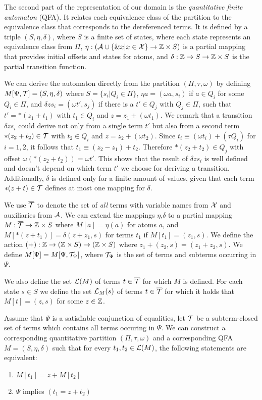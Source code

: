 The second part of the representation of our domain is the \emph{quantitative finite automaton} (QFA). It relates each equivalence class of the partition to the equivalence class that corresponds to the dereferenced terms.
It is defined by a triple $(S, \eta, \delta)$, where $S$ is a finite set of states, where each state represents an equivalence class from $\Pi$, $\eta : (\mathcal{A} \cup \{\&x | x \in \mathcal{X}\} \rightarrow \mathbb{Z} \times S)$ is a partial mapping that provides initial offsets and states for atoms, and $\delta : \mathbb{Z} \rightarrow S \rightarrow \mathbb{Z} \times S$ is the partial transition function.

We can derive the automaton directly from the partition $(\Pi, \tau, \omega)$ by defining $M[\Psi,\mathcal{T}] = (S, \eta, \delta)$ where $S = \{s_i | Q_i \in \Pi\}$, $\eta a = (\omega a, s_i)$ if $a \in Q_i$ for some $Q_i \in \Pi$, and $\delta z s_i = (\omega t', s_j)$ if there is a $t' \in Q_j$ with $Q_j \in \Pi$, such that $t' = *(z_1 + t_1)$ with $t_1 \in Q_i$ and $z = z_1 + (\omega t_1)$.
We remark that a transition $\delta z s_i$ could derive not only from a single term $t'$ but also from a second term $*(z_2 + t_2) \in \mathcal{T}$ with $t_2 \in Q_i$ and $z = z_2 + (\omega t_2)$.
Since $t_i \equiv (\omega t_i) + (\tau Q_i)$ for $i = 1,2$, it follows that $t_1 \equiv (z_2 - z_1)+ t_2$. Therefore $*(z_2+t_2)\in Q_j$ with offset $\omega(*(z_2+t_2)) = \omega t'$.
This shows that the result of $\delta z s_i$ is well defined and doesn't depend on which term $t'$ we choose for deriving a transition.
Additionally, $\delta$ is defined only for a finite amount of values, given that each term $*(z + t) \in \mathcal{T}$ defines at most one mapping for $\delta$.

We use ${\overline{\mathcal{T}}}$ to denote the set of \emph{all} terms with variable names from $\mathcal{X}$ and auxiliaries from $\mathcal{A}$.
We can extend the mappings $\eta$,$\delta$ to a partial mapping $M : {\overline{\mathcal{T}}} \rightarrow \mathbb{Z} \times S$ where $M[a] = \eta(a)$ for atoms $a$, and $M[*(z+t_1)] = \delta(z+z_1, s)$ for terms $t_1$ if $M[t_1] = (z_1,s)$.
We define the action $(+): \mathbb{Z} \rightarrow (\mathbb{Z} \times S) \rightarrow (\mathbb{Z} \times S)$ where $z_1 + (z_2,s) = (z_1 + z_2, s)$.
We define $M[\Psi] = M[\Psi,\mathcal{T}_\Psi]$, where $\mathcal{T}_\Psi$ is the set of terms and subterms occurring in $\Psi$.

We also define the set $\mathcal{L}(M)$ of terms $t \in {\overline{\mathcal{T}}}$ for which $M$ is defined.
For each state $s \in S$ we define the set $\mathcal{L}_M(s)$ of terms $t \in {\overline{\mathcal{T}}}$ for which it holds that $M[t] = (z, s)$ for some $z \in \mathbb{Z}$.
\begin{theorem}
  Assume that $\Psi$ is a satisfiable conjunction of equalities, let $\mathcal{T}$ be a subterm-closed set of terms which contains all terms occuring in $\Psi$. We can construct a corresponding quantitative partition $(\Pi, \tau,\omega)$
  and a corresponding QFA $M = (S, \eta, \delta)$ such that for every $t_1, t_2 \in \mathcal{L}(M)$, the following statements are equivalent:
  \begin{enumerate}
    \item $M[t_1] = z + M[t_2]$
    \item $\Psi$ implies $(t_1 = z + t_2)$
  \end{enumerate}
\end{theorem}

